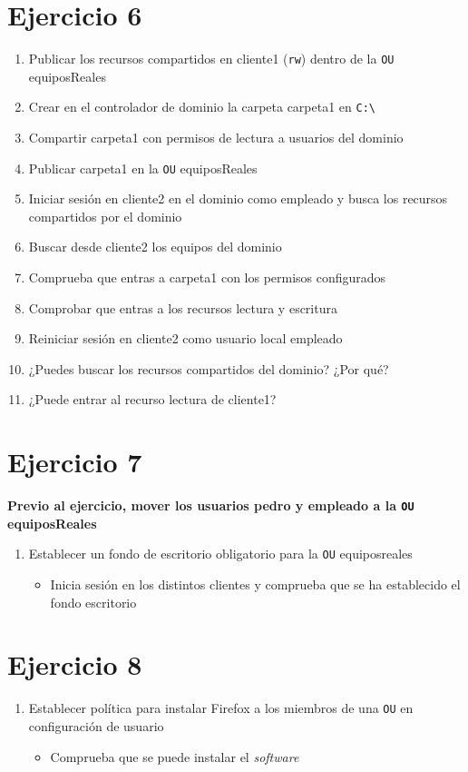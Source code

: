 \documentclass[11pt]{article}
\begin{document}
\section{Ejercicio 6}
\label{sec:orgcbfc45a}
\begin{enumerate}
\item Publicar los recursos compartidos en cliente1 (\texttt{rw}) dentro de la \texttt{OU} equiposReales
\item Crear en el controlador de dominio la carpeta carpeta1 en \texttt{C:\textbackslash{}}
\item Compartir carpeta1 con permisos de lectura a usuarios del dominio
\item Publicar carpeta1 en la \texttt{OU} equiposReales
\item Iniciar sesión en cliente2 en el dominio como empleado y busca los recursos compartidos por el dominio
\item Buscar desde cliente2 los equipos del dominio
\item Comprueba que entras a carpeta1 con los permisos configurados
\item Comprobar que entras a los recursos lectura y escritura
\item Reiniciar sesión en cliente2 como usuario local empleado
\item ¿Puedes buscar los recursos compartidos del dominio? ¿Por qué?
\item ¿Puede entrar al recurso lectura de cliente1?
\end{enumerate}


\section{Ejercicio 7}
\label{sec:orgfc9a264}
\textbf{Previo al ejercicio, mover los usuarios pedro y empleado a la \texttt{OU} equiposReales}
\begin{enumerate}
\item Establecer un fondo de escritorio obligatorio para la \texttt{OU} equiposreales
\begin{itemize}
\item Inicia sesión en los distintos clientes y comprueba que se ha establecido el fondo escritorio
\end{itemize}
\end{enumerate}


\section{Ejercicio 8}
\label{sec:org7a3f726}
\begin{enumerate}
\item Establecer política para instalar Firefox a los miembros de una \texttt{OU} en configuración de usuario
\begin{itemize}
\item Comprueba que se puede instalar el \emph{software}
\end{itemize}
\end{enumerate}
\end{document}

